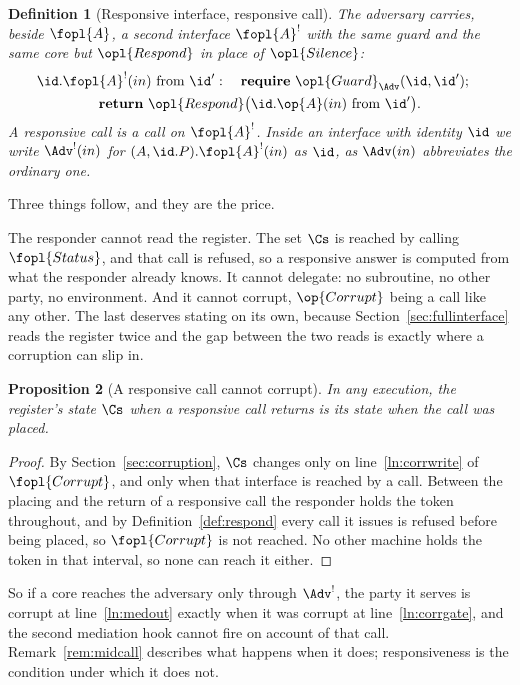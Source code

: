 \documentclass[10pt,oneside,openany]{book}
\theoremstyle{accentdef}
\newtheorem{definition}{Definition}[chapter]
\theoremstyle{accentplain}
\newtheorem{proposition}[definition]{Proposition}
\begin{document}
\begin{definition}[Responsive interface, responsive call]\label{def:respcall}
The adversary carries, beside $\fopl{A}$, a second interface $\fopl{A}^{!}$ with the same guard and
the same core but $\opl{Respond}$ in place of $\opl{Silence}$:
\[
  \begin{gathered}
  \id.\fopl{A}^{!}(in) \text{ from } \id'
  :\quad
  \textbf{require}\ \opl{Guard}_{\Adv}(\id,\id') ;\quad \\
  \textbf{return}\ \opl{Respond}\bigl(\id.\op{A}(in) \text{ from } \id'\bigr) .
  \end{gathered}
\]
A \emph{responsive call} is a call on $\fopl{A}^{!}$. Inside an interface with identity $\id$ we
write $\Adv^{!}(in)$ for $(A,\id.P).\fopl{A}^{!}(in)$ as $\id$, as $\Adv(in)$ abbreviates the
ordinary one.
\end{definition}

Three things follow, and they are the price.

The responder cannot read the register. The set $\Cs$ is reached by calling $\fopl{Status}$, and that call
is refused, so a responsive answer is computed from what the responder already knows. It cannot
delegate: no subroutine, no other party, no environment. And it cannot corrupt, $\op{Corrupt}$
being a call like any other. The last deserves stating on its own, because
Section~\ref{sec:fullinterface} reads the register twice and the gap between the two reads is
exactly where a corruption can slip in.

\begin{proposition}[A responsive call cannot corrupt]\label{prop:respcorr}
In any execution, the register's state $\Cs$ when a responsive call returns is its state when
the call was placed.
\end{proposition}

\begin{proof}
By Section~\ref{sec:corruption}, $\Cs$ changes only on line~\ref{ln:corrwrite} of $\fopl{Corrupt}$,
and only when that interface is reached by a call. Between the placing and the return of a
responsive call the responder holds the token throughout, and by Definition~\ref{def:respond}
every call it issues is refused before being placed, so $\fopl{Corrupt}$ is not reached. No other
machine holds the token in that interval, so none can reach it either.
\end{proof}

So if a core reaches the adversary only through $\Adv^{!}$, the party it serves is corrupt at
line~\ref{ln:medout} exactly when it was corrupt at line~\ref{ln:corrgate}, and the second
mediation hook cannot fire on account of that call. Remark~\ref{rem:midcall} describes what happens
when it does; responsiveness is the condition under which it does not.
\end{document}
